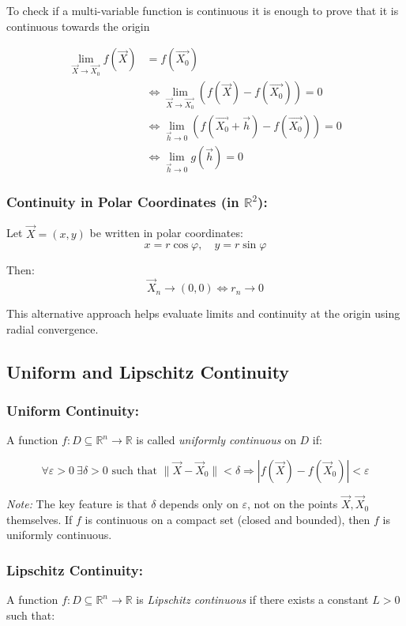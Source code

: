 To check if a multi-variable function is continuous it is enough to prove that it is continuous towards the origin

\begin{align*}
    \lim_{\vec{X} \to \vec{X_0}}f(\vec{X}) &= f(\vec{X_0}) \\
    &\iff \lim_{\vec{X} \to \vec{X_0}} \left(f(\vec{X}) - f(\vec{X_0})\right) = 0 \\
    &\iff \lim_{\vec{h} \to 0} \left(f(\vec{X_0} + \vec{h}) - f(\vec{X_0})\right) = 0 \\
    &\iff \lim_{\vec{h} \to 0} g(\vec{h}) = 0
\end{align*}

\subsubsection{Continuity in Polar Coordinates (in \( \mathbb{R}^2 \)):}

Let \( \vec{X} = (x, y) \) be written in polar coordinates:
\[
x = r \cos \varphi, \quad y = r \sin \varphi
\]

Then:
\[
\vec{X}_n \to (0, 0) \iff r_n \to 0
\]

This alternative approach helps evaluate limits and continuity at the origin using radial convergence.

\subsection{Uniform and Lipschitz Continuity}

\subsubsection{Uniform Continuity:}  
A function \( f : D \subseteq \mathbb{R}^n \to \mathbb{R} \) is called \emph{uniformly continuous} on \( D \) if:

\[
\forall \varepsilon > 0 \ \exists \delta > 0 \text{ such that } \|\vec{X} - \vec{X}_0\| < \delta \Rightarrow |f(\vec{X}) - f(\vec{X}_0)| < \varepsilon
\]

\textit{Note:} The key feature is that \( \delta \) depends only on \( \varepsilon \), not on the points \( \vec{X}, \vec{X}_0 \) themselves.  
If \( f \) is continuous on a compact set (closed and bounded), then \( f \) is uniformly continuous.

\subsubsection{Lipschitz Continuity:}  
A function \( f : D \subseteq \mathbb{R}^n \to \mathbb{R} \) is \emph{Lipschitz continuous} if there exists a constant \( L > 0 \) such that:

